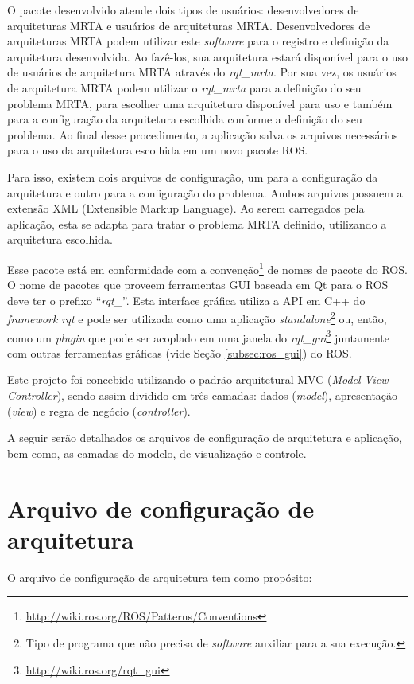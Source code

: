     O pacote desenvolvido atende dois tipos de usuários: desenvolvedores de arquiteturas MRTA e usuários de arquiteturas MRTA. Desenvolvedores de arquiteturas MRTA podem utilizar este \textit{software} para o registro e definição da arquitetura desenvolvida. Ao fazê-los, sua arquitetura estará disponível para o uso de usuários de arquitetura MRTA através do \textit{rqt\_mrta}. Por sua vez, os usuários de arquitetura MRTA podem utilizar o \textit{rqt\_mrta} para a definição do seu problema MRTA, para escolher uma arquitetura disponível para uso e também para a configuração da arquitetura escolhida conforme a definição do seu problema. Ao final desse procedimento, a aplicação salva os arquivos necessários para o uso da arquitetura escolhida em um novo pacote ROS.
    
    Para isso, existem dois arquivos de configuração, um para a configuração da arquitetura e outro para a configuração do problema. Ambos arquivos possuem a extensão XML (Extensible Markup Language). Ao serem carregados pela aplicação, esta se adapta para tratar o problema MRTA definido, utilizando a arquitetura escolhida. 
    
    Esse pacote está em conformidade com a convenção\footnote{\url{http://wiki.ros.org/ROS/Patterns/Conventions}} de nomes de pacote do ROS. O nome de pacotes que proveem ferramentas GUI baseada em Qt para o ROS deve ter o prefixo ``\textit{rqt\_}''. Esta interface gráfica utiliza a API em C++ do \textit{framework rqt} e pode ser utilizada como uma aplicação \textit{standalone}\footnote{Tipo de programa que não precisa de \textit{software} auxiliar para a sua execução.} ou, então, como um \textit{plugin} que pode ser acoplado em uma janela do \textit{rqt\_gui}\footnote{\url{http://wiki.ros.org/rqt_gui}} juntamente com outras ferramentas gráficas (vide Seção \ref{subsec:ros_gui}) do ROS.
    
    Este projeto foi concebido utilizando o padrão arquitetural MVC (\textit{Model-View-Controller}), sendo assim dividido em três camadas: dados (\textit{model}), apresentação (\textit{view}) e regra de negócio (\textit{controller}).
    
    A seguir serão detalhados os arquivos de configuração de arquitetura e aplicação, bem como, as camadas do modelo, de visualização e controle.
        
    \section{Arquivo de configuração de arquitetura} \label{sec:arch_config}
        O arquivo de configuração de arquitetura tem como propósito:
        
